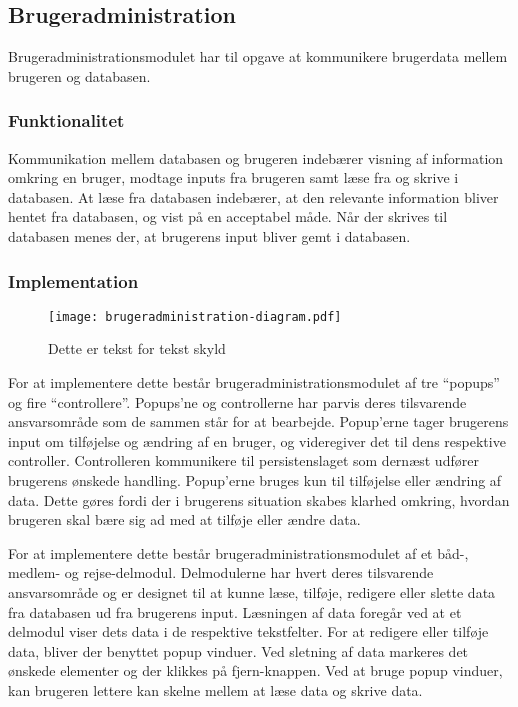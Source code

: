 \subsection{Brugeradministration}
\label{sub:Brugeradministration}

Brugeradministrationsmodulet har til opgave at kommunikere brugerdata mellem brugeren og databasen.

\subsubsection{Funktionalitet}
\label{ssub:Brugeradministration_funktionalitet}

Kommunikation mellem databasen og brugeren indebærer visning af information omkring en bruger, modtage inputs fra brugeren samt læse fra og skrive i databasen. At læse fra databasen indebærer, at den relevante information bliver hentet fra databasen, og vist på en acceptabel måde. Når der skrives til databasen menes der, at brugerens input bliver gemt i databasen. 

\subsubsection{Implementation}
\label{ssub:Brugeradministration_implementation}

\begin{figure}
  \centering
  \texttt{[image: brugeradministration-diagram.pdf]}
  \caption{Dette er tekst for tekst skyld}
  \label{fig:brugermod}
\end{figure}

For at implementere dette består brugeradministrationsmodulet af tre \enquote{popups} og fire \enquote{controllere}. Popups'ne og controllerne har parvis deres tilsvarende ansvarsområde som de sammen står for at bearbejde. Popup'erne tager brugerens input om tilføjelse og ændring af en bruger, og videregiver det til dens respektive controller. Controlleren kommunikere til persistenslaget som dernæst udfører brugerens ønskede handling. Popup'erne bruges kun til tilføjelse eller ændring af data. Dette gøres fordi der i brugerens situation skabes klarhed omkring, hvordan brugeren skal bære sig ad med at tilføje eller ændre data.

For at implementere dette består brugeradministrationsmodulet af et båd-, medlem- og rejse-delmodul. Delmodulerne har hvert deres tilsvarende ansvarsområde og er designet til at kunne læse, tilføje, redigere eller slette data fra databasen ud fra brugerens input. Læsningen af data foregår ved at et delmodul viser dets data i de respektive tekstfelter. For at redigere eller tilføje data, bliver der benyttet popup vinduer. Ved sletning af data markeres det ønskede elementer og der klikkes på fjern-knappen. Ved at bruge popup vinduer, kan brugeren lettere kan skelne mellem at læse data og skrive data.
